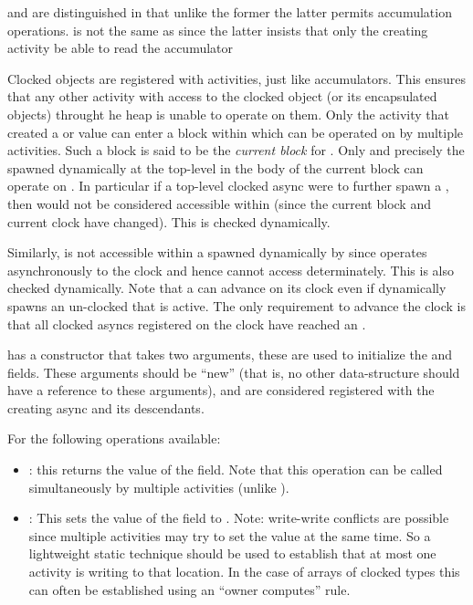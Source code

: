  and  are distinguished in that
unlike the former the latter permits accumulation
operations.  is not the same as
 since the latter insists that only the creating
activity be able to read the accumulator

Clocked objects are registered with activities, just like
accumulators.  This ensures that any other activity with access to the
clocked object (or its encapsulated objects) throught he heap is
unable to operate on them.  Only the activity that created a
 or  value  can enter a
 block within which  can be operated on
by multiple activities. Such a block is said to be the {\em current
  block} for . Only and precisely the 
spawned dynamically at the top-level in the body of the current block
can operate on . In particular if a top-level clocked async
were to further spawn a , then  would
not be considered accessible within  (since the current block
and current clock have changed).  This is checked dynamically.

Similarly,  is not accessible within a  spawned
dynamically by  since  operates asynchronously to the
clock and hence cannot access  determinately. This is also
checked dynamically. Note that a  can advance
on its clock even if  dynamically spawns an un-clocked
 that is active. The only requirement to advance the clock
is that all clocked asyncs registered on the clock have reached an
.

 has a constructor that takes two  arguments,
these are used to initialize the  and  fields. These arguments
should be ``new'' (that is, no other data-structure should have a
reference to these arguments), and are considered registered with the
creating async and its descendants.

For  the following operations available:
\begin{itemize}
\item {}: this returns the value of the  field. Note
  that this operation can be called simultaneously by multiple
  activities  (unlike ). 

\item {}: This sets the value of the  field to .
Note: write-write conflicts are possible since multiple activities may
try to set the value at the same time. So a lightweight static
technique should be used to establish that at most one activity is
writing to that location. In the case of arrays of clocked types this
can often be established using an ``owner computes'' rule.
\end{itemize}

